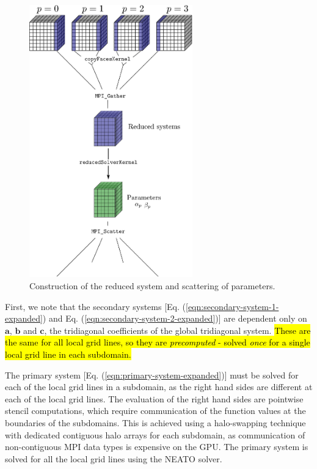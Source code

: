 \documentclass{elsarticle}
\begin{document}
\begin{figure}
\begin{center}
\includegraphics[width=200pt]{img/constructing-reduced-system.eps}
\caption{Construction of the reduced system and scattering of parameters.}
\label{fig:constructing-reduced-system}
\end{center}
\end{figure}

First, we note that
the secondary systems
[Eq. (\ref{eqn:secondary-system-1-expanded}) and
 Eq. (\ref{eqn:secondary-system-2-expanded})]
are dependent only on $\bm{a}$, $\bm{b}$ and $\bm{c}$,
the tridiagonal coefficients of the global tridiagonal system.
\hl{These are the same for all local grid lines,
so they are \emph{precomputed} -
solved \emph{once} for a single local grid line in each subdomain.}

The primary system [Eq. (\ref{eqn:primary-system-expanded})] must be solved
for each of the local grid lines in a subdomain,
as the right hand sides are different at each of the local grid lines. 
The evaluation of the right hand sides are
pointwise stencil computations,
which require communication of the
function values at the boundaries of the subdomains.
This is achieved using a halo-swapping technique
with dedicated contiguous halo arrays for each subdomain,
as communication of non-contiguous MPI
data types is expensive on the GPU.
The primary system is solved for all the local grid lines
using the NEATO solver.
\end{document}

